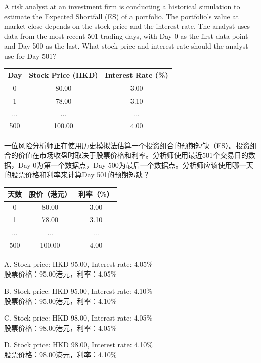\documentclass{article}
\newcounter{question} %
\begin{document}
\begin{question}
    A risk analyst at an investment firm is conducting a historical simulation to estimate the Expected Shortfall (ES) of a portfolio. The portfolio's value at market close depends on the stock price and the interest rate. The analyst uses data from the most recent 501 trading days, with Day 0 as the first data point and Day 500 as the last. What stock price and interest rate should the analyst use for Day 501?

    \begin{table}[h]
        \centering
        \begin{tabular}{ccc}
            \hline
            Day & Stock Price (HKD) & Interest Rate (\%) \\
            \hline
            0   & 80.00              & 3.00              \\
            1   & 78.00              & 3.10              \\
            ... & ...                & ...               \\
            500 & 100.00             & 4.00              \\
            \hline
        \end{tabular}
    \end{table}
一位风险分析师正在使用历史模拟法估算一个投资组合的预期短缺（ES）。投资组合的价值在市场收盘时取决于股票价格和利率。分析师使用最近501个交易日的数据，Day 0为第一个数据点，Day 500为最后一个数据点。分析师应该使用哪一天的股票价格和利率来计算Day 501的预期短缺？
\begin{table}[h]
    \centering
    \begin{tabular}{ccc}
        \hline
        天数 & 股价（港元） & 利率（\%） \\
        \hline
        0   & 80.00              & 3.00              \\
        1   & 78.00              & 3.10              \\
        ... & ...                & ...               \\
        500 & 100.00             & 4.00              \\
        \hline
    \end{tabular}
\end{table}

   
\end{question}

\begin{choices}
    \item A. Stock price: HKD 95.00, Interest rate: 4.05\%\\
    股票价格：95.00港元，利率：4.05\%
    \item B. Stock price: HKD 95.00, Interest rate: 4.10\%\\
    股票价格：95.00港元，利率：4.10\%
    \item C. Stock price: HKD 98.00, Interest rate: 4.05\%\\
    股票价格：98.00港元，利率：4.05\%
    \item D. Stock price: HKD 98.00, Interest rate: 4.10\%\\
    股票价格：98.00港元，利率：4.10\%
\end{choices}
\end{document}
